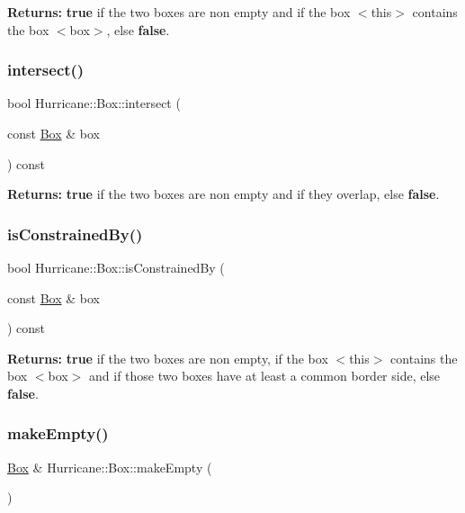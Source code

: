 {\bfseries Returns\+:} {\bfseries true} if the two boxes are non empty and if the box {\ttfamily $<$this$>$} contains the box {\ttfamily $<$box$>$}, else {\bfseries false}. \mbox{\label{classHurricane_1_1Box_ae76b57bf6399b29021813da8d3f306ec}} 
\subsubsection{\texorpdfstring{intersect()}{intersect()}}
{\footnotesize\ttfamily bool Hurricane\+::\+Box\+::intersect (\begin{DoxyParamCaption}\item[{const \mbox{\hyperlink{classHurricane_1_1Box}{Box}} \&}]{box }\end{DoxyParamCaption}) const}

{\bfseries Returns\+:} {\bfseries true} if the two boxes are non empty and if they overlap, else {\bfseries false}. \mbox{\label{classHurricane_1_1Box_a70d832443d97cb40ec7cb4f0f959a977}} 
\subsubsection{\texorpdfstring{is\+Constrained\+By()}{isConstrainedBy()}}
{\footnotesize\ttfamily bool Hurricane\+::\+Box\+::is\+Constrained\+By (\begin{DoxyParamCaption}\item[{const \mbox{\hyperlink{classHurricane_1_1Box}{Box}} \&}]{box }\end{DoxyParamCaption}) const}

{\bfseries Returns\+:} {\bfseries true} if the two boxes are non empty, if the box {\ttfamily $<$this$>$} contains the box {\ttfamily $<$box$>$} and if those two boxes have at least a common border side, else {\bfseries false}. \mbox{\label{classHurricane_1_1Box_a0717b1b105f65f8284c9b4e36df3a766}} 
\subsubsection{\texorpdfstring{make\+Empty()}{makeEmpty()}}
{\footnotesize\ttfamily \mbox{\hyperlink{classHurricane_1_1Box}{Box}} \& Hurricane\+::\+Box\+::make\+Empty (\begin{DoxyParamCaption}{ }\end{DoxyParamCaption})}

